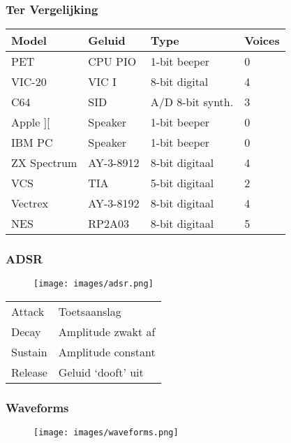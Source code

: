 
\begin{frame}
\frametitle{Ter Vergelijking}

\begin{tabular}{|l|l|l|l|}
\hline Model & Geluid & Type & Voices \\ \hline
PET & CPU PIO & 1-bit beeper & 0 \\
VIC-20 & VIC I & 8-bit digital & 4 \\
C64 & SID & A/D 8-bit synth. & 3 \\ \hline
Apple ][ & Speaker & 1-bit beeper & 0 \\
IBM PC & Speaker & 1-bit beeper & 0 \\
ZX Spectrum & AY-3-8912 & 8-bit digitaal & 4 \\ \hline
VCS & TIA & 5-bit digitaal & 2 \\
Vectrex & AY-3-8192 & 8-bit digitaal & 4 \\
NES & RP2A03 & 8-bit digitaal & 5 \\ \hline
\end{tabular}

\end{frame}


\begin{frame}
\frametitle{ADSR}

\begin{figure}
\texttt{[image: images/adsr.png]}
\end{figure}

\begin{tabular}{l|l}
Attack & Toetsaanslag \\
Decay & Amplitude zwakt af \\
Sustain & Amplitude constant \\
Release & Geluid `dooft' uit \\
\end{tabular}

\end{frame}


\begin{frame}
\frametitle{Waveforms}

\begin{figure}
\texttt{[image: images/waveforms.png]}
\end{figure}

\end{frame}

